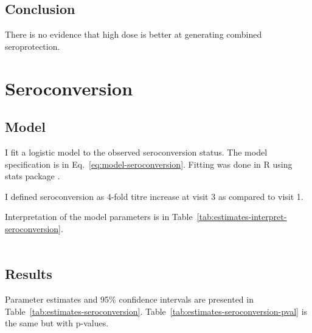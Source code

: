 \documentclass[11pt]{article}
\begin{document}




\subsection{Conclusion}

There is no evidence that high dose is better at generating combined
seroprotection.

\section{Seroconversion}

\subsection{Model}

I fit a logistic model to the observed seroconversion status.
The model specification is in Eq.~\ref{eq:model-seroconversion}.
Fitting was done in R using stats package \cite{R}.

I defined seroconversion as 4-fold titre increase at visit 3 as compared to
visit 1.

Interpretation of the model parameters is in
Table~\ref{tab:estimates-interpret-seroconversion}.

\begin{equation}
    \begin{gathered}
        \label{eq:model-seroconversion}
        
    \end{gathered}
\end{equation}





\subsection{Results}

Parameter estimates and 95\% confidence intervals
are presented in Table~\ref{tab:estimates-seroconversion}.
Table~\ref{tab:estimates-seroconversion-pval} is the same but with p-values.




\end{document}
